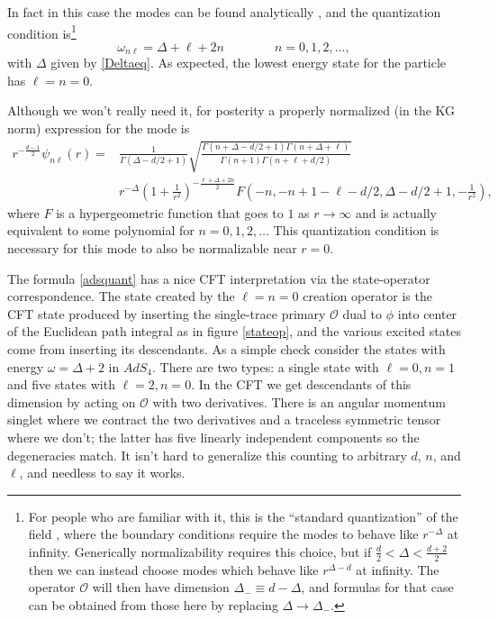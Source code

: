 \documentclass[12pt]{article}
\newcommand{\be}{\begin{equation}}
\newcommand{\ee}{\end{equation}}
\newcommand{\mO}{\mathcal{O}}
\begin{document}
In fact in this case the modes can be found analytically \cite{Breitenlohner:1982jf}, and the quantization condition is\footnote{For people who are familiar with it, this is the ``standard quantization'' of the field \cite{Breitenlohner:1982jf,Klebanov:1999tb}, where the boundary conditions require the modes to behave like $r^{-\Delta}$ at infinity.  Generically normalizability requires this choice, but if $\frac{d}{2}<\Delta<\frac{d+2}{2}$ then we can instead choose modes which behave like $r^{\Delta-d}$ at infinity.  The operator $\mO$ will then have dimension $\Delta_-\equiv d-\Delta$, and formulas for that case can be obtained from those here by replacing $\Delta \to\Delta_-$.}
\be\label{adsquant}
\omega_{n\ell}=\Delta+\ell+2n \qquad \qquad n=0,1,2,\ldots,
\ee
with $\Delta$ given by \eqref{Deltaeq}.  As expected, the lowest energy state for the particle has $\ell=n=0$.  

Although we won't really need it, for posterity a properly normalized (in the KG norm) expression for the mode is
\begin{align}\nonumber
r^{-\frac{d-1}{2}}\psi_{n\ell}(r)=&\frac{1}{\Gamma(\Delta-d/2+1)}\sqrt{\frac{\Gamma(n+\Delta-d/2+1)\Gamma(n+\Delta+\ell)}{\Gamma(n+1)\Gamma(n+\ell+d/2)}}\\
&r^{-\Delta}\left(1+\frac{1}{r^2}\right)^{-\frac{\ell+\Delta+2n}{2}}F\left(-n,-n+1-\ell-d/2,\Delta-d/2+1,-\frac{1}{r^2}\right),\label{adsmode}
\end{align}
where $F$ is a hypergeometric function that goes to $1$ as $r\to \infty$ and is actually equivalent to some polynomial for $n= 0,1,2,\ldots$  This quantization condition is necessary for this mode to also be normalizable near $r=0$.

The formula \eqref{adsquant}  has a nice CFT interpretation via the state-operator correspondence.  The state created by the $\ell=n=0$ creation operator is the CFT state produced by inserting the single-trace primary $\mathcal{O}$ dual to $\phi$ into center of the Euclidean path integral as in figure \ref{stateop}, and the various excited states come from inserting its descendants.  As a simple check consider the states with energy $\omega=\Delta+2$ in $AdS_4$.  There are two types: a single state with $\ell=0, n=1$ and five states with $\ell=2, n=0$.  In the CFT we get descendants of this dimension by acting on $\mathcal{O}$ with two derivatives.  There is an angular momentum singlet where we contract the two derivatives and a traceless symmetric tensor where we don't; the latter has five linearly independent components so the degeneracies match.  It isn't hard to generalize this counting to arbitrary $d$, $n$, and $\ell$, and needless to say it works.
\end{document}
